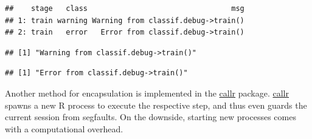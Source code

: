 \documentclass[
]{scrbook}
\newenvironment{Shaded}{\begin{snugshade}}{\end{snugshade}}
\newcommand{\AttributeTok}[1]{\textcolor[rgb]{0.77,0.63,0.00}{#1}}
\newcommand{\DecValTok}[1]{\textcolor[rgb]{0.00,0.00,0.81}{#1}}
\newcommand{\FunctionTok}[1]{\textcolor[rgb]{0.00,0.00,0.00}{#1}}
\newcommand{\NormalTok}[1]{#1}
\newcommand{\OtherTok}[1]{\textcolor[rgb]{0.56,0.35,0.01}{#1}}
\newcommand{\SpecialCharTok}[1]{\textcolor[rgb]{0.00,0.00,0.00}{#1}}
\newcommand{\StringTok}[1]{\textcolor[rgb]{0.31,0.60,0.02}{#1}}
\renewenvironment{Shaded} {\begin{snugshade}\small} {\end{snugshade}}
\begin{document}
\begin{Shaded}
\end{Shaded}

\begin{verbatim}
##    stage   class                                 msg
## 1: train warning Warning from classif.debug->train()
## 2: train   error   Error from classif.debug->train()
\end{verbatim}

\begin{Shaded}
\end{Shaded}

\begin{verbatim}
## [1] "Warning from classif.debug->train()"
\end{verbatim}

\begin{Shaded}
\end{Shaded}

\begin{verbatim}
## [1] "Error from classif.debug->train()"
\end{verbatim}

Another method for encapsulation is implemented in the \href{https://cran.r-project.org/package=callr}{callr} package.
\href{https://cran.r-project.org/package=callr}{callr} spawns a new R process to execute the respective step, and thus even guards the current session from segfaults.
On the downside, starting new processes comes with a computational overhead.

\begin{Shaded}
\end{Shaded}
\end{document}
